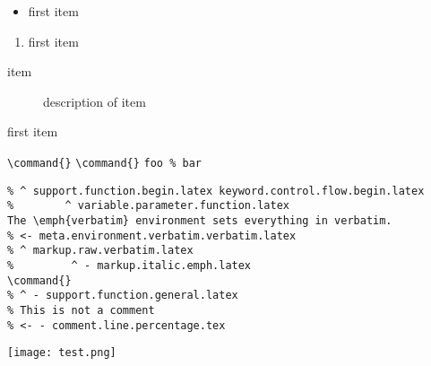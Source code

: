 \documentclass[12pt]{article}
\newcommand\"{quote}
\begin{document}

\begin{itemize}
\item first item
\end{itemize}

\begin{enumerate}
\item first item
\end{enumerate}

\begin{description}
\item[item] description of item
\end{description}

\begin{list}{()}{}
\item first item
\end{list}


\command{}
\verb|\command{}|
\verb+\command{}+
\verb|foo % bar|


\begin{verbatim}
% ^ support.function.begin.latex keyword.control.flow.begin.latex
%        ^ variable.parameter.function.latex
The \emph{verbatim} environment sets everything in verbatim.
% <- meta.environment.verbatim.verbatim.latex
% ^ markup.raw.verbatim.latex
%         ^ - markup.italic.emph.latex
\command{}
% ^ - support.function.general.latex
% This is not a comment
% <- - comment.line.percentage.tex
\end{verbatim}




\texttt{[image: test.png]}
\end{document}
